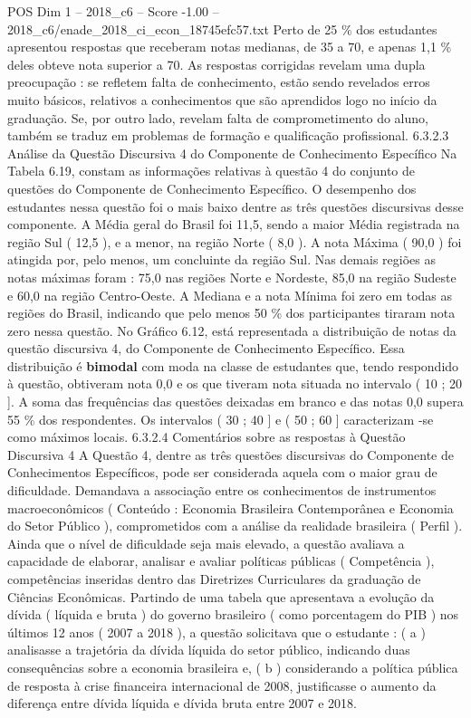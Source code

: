 \begin{textsample}{POS Dim 1 – 2018\_c6 – Score -1.00 – 2018\_c6/enade\_2018\_ci\_econ\_18745efc57.txt}
Perto de 25 \% dos estudantes apresentou respostas que receberam notas medianas, de 35 a 70, e apenas 1,1 \% deles obteve nota superior a 70.
As respostas corrigidas revelam uma dupla preocupação : se refletem falta de conhecimento, estão sendo revelados erros muito básicos, relativos a conhecimentos que são aprendidos logo no início da graduação.
Se, por outro lado, revelam falta de comprometimento do aluno, também se traduz em problemas de formação e qualificação profissional. 6.3.2.3 Análise da Questão Discursiva 4 do Componente de Conhecimento Específico Na Tabela 6.19, constam as informações relativas à questão 4 do conjunto de questões do Componente de Conhecimento Específico.
O desempenho dos estudantes nessa questão foi o mais baixo dentre as três questões discursivas desse componente.
A Média geral do Brasil foi 11,5, sendo a maior Média registrada na região Sul ( 12,5 ), e a menor, na região Norte ( 8,0 ).
A nota Máxima ( 90,0 ) foi atingida por, pelo menos, um concluinte da região Sul.
Nas demais regiões as notas máximas foram : 75,0 nas regiões Norte e Nordeste, 85,0 na região Sudeste e 60,0 na região Centro-Oeste.
A Mediana e a nota Mínima foi zero em todas as regiões do Brasil, indicando que pelo menos 50 \% dos participantes tiraram nota zero nessa questão.
No Gráfico 6.12, está representada a distribuição de notas da questão discursiva 4, do Componente de Conhecimento Específico.
Essa distribuição é \textbf{bimodal} com moda na classe de estudantes que, tendo respondido à questão, obtiveram nota 0,0 e os que tiveram nota situada no intervalo ( 10 ; 20 ].
A soma das frequências das questões deixadas em branco e das notas 0,0 supera 55 \% dos respondentes.
Os intervalos ( 30 ; 40 ] e ( 50 ; 60 ] caracterizam -se como máximos locais. 6.3.2.4 Comentários sobre as respostas à Questão Discursiva 4 A Questão 4, dentre as três questões discursivas do Componente de Conhecimentos Específicos, pode ser considerada aquela com o maior grau de dificuldade.
Demandava a associação entre os conhecimentos de instrumentos macroeconômicos ( Conteúdo : Economia Brasileira Contemporânea e Economia do Setor Público ), comprometidos com a análise da realidade brasileira ( Perfil ).
Ainda que o nível de dificuldade seja mais elevado, a questão avaliava a capacidade de elaborar, analisar e avaliar políticas públicas ( Competência ), competências inseridas dentro das Diretrizes Curriculares da graduação de Ciências Econômicas.
Partindo de uma tabela que apresentava a evolução da dívida ( líquida e bruta ) do governo brasileiro ( como porcentagem do PIB ) nos últimos 12 anos ( 2007 a 2018 ), a questão solicitava que o estudante : ( a ) analisasse a trajetória da dívida líquida do setor público, indicando duas consequências sobre a economia brasileira e, ( b ) considerando a política pública de resposta à crise financeira internacional de 2008, justificasse o aumento da diferença entre dívida líquida e dívida bruta entre 2007 e 2018.

\end{textsample}
